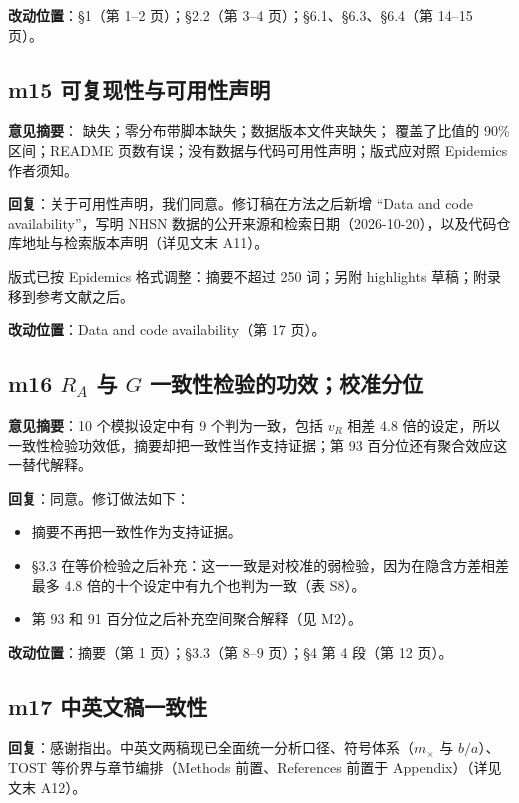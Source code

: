 \documentclass[UTF8,a4paper,11pt,fontset=none]{ctexart}
\providecommand{\tightlist}{\setlength{\itemsep}{1pt}\setlength{\parskip}{0pt}}
\begin{document}
\textbf{改动位置}：§1（第 1--2 页）；§2.2（第 3--4 页）；§6.1、§6.3、§6.4（第 14--15 页）。

\subsection*{m15 可复现性与可用性声明}

\textbf{意见摘要}： 缺失；零分布带脚本缺失；数据版本文件夹缺失； 覆盖了比值的 90\% 区间；README 页数有误；没有数据与代码可用性声明；版式应对照 Epidemics 作者须知。

\textbf{回复}：关于可用性声明，我们同意。修订稿在方法之后新增 ``Data and code availability''，写明 NHSN 数据的公开来源和检索日期（2026-10-20），以及代码仓库地址与检索版本声明（详见文末 A11）。

版式已按 Epidemics 格式调整：摘要不超过 250 词；另附 highlights 草稿；附录移到参考文献之后。

\textbf{改动位置}：Data and code availability（第 17 页）。

\subsection*{\texorpdfstring{m16 \(R_A\) 与 \(G\) 一致性检验的功效；校准分位}{m16 R\_A 与 G 一致性检验的功效；校准分位}}

\textbf{意见摘要}：10 个模拟设定中有 9 个判为一致，包括 \(v_R\) 相差 4.8 倍的设定，所以一致性检验功效低，摘要却把一致性当作支持证据；第 93 百分位还有聚合效应这一替代解释。

\textbf{回复}：同意。修订做法如下：

\begin{itemize}
\tightlist
\item
  摘要不再把一致性作为支持证据。
\item
  §3.3 在等价检验之后补充：这一一致是对校准的弱检验，因为在隐含方差相差最多 4.8 倍的十个设定中有九个也判为一致（表 S8）。
\item
  第 93 和 91 百分位之后补充空间聚合解释（见 M2）。
\end{itemize}

\textbf{改动位置}：摘要（第 1 页）；§3.3（第 8--9 页）；§4 第 4 段（第 12 页）。

\subsection*{m17 中英文稿一致性}

\textbf{回复}：感谢指出。中英文两稿现已全面统一分析口径、符号体系（\(m_\times\) 与 \(b/a\)）、TOST 等价界与章节编排（Methods 前置、References 前置于 Appendix）（详见文末 A12）。
\end{document}
